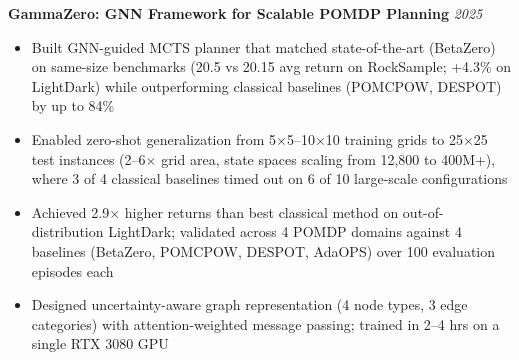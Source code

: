 %
%

\textbf{GammaZero: GNN Framework for Scalable POMDP Planning} \hfill \textit{2025}
\vspace{0.1cm}
\begin{itemize}
\item Built GNN-guided MCTS planner that matched state-of-the-art (BetaZero) on same-size benchmarks (20.5 vs 20.15 avg return on RockSample; +4.3\% on LightDark) while outperforming classical baselines (POMCPOW, DESPOT) by up to 84\%
\item Enabled zero-shot generalization from 5$\times$5--10$\times$10 training grids to 25$\times$25 test instances (2--6$\times$ grid area, state spaces scaling from 12,800 to 400M+), where 3 of 4 classical baselines timed out on 6 of 10 large-scale configurations
\item Achieved 2.9$\times$ higher returns than best classical method on out-of-distribution LightDark; validated across 4 POMDP domains against 4 baselines (BetaZero, POMCPOW, DESPOT, AdaOPS) over 100 evaluation episodes each
\item Designed uncertainty-aware graph representation (4 node types, 3 edge categories) with attention-weighted message passing; trained in 2--4 hrs on a single RTX 3080 GPU
\end{itemize}




